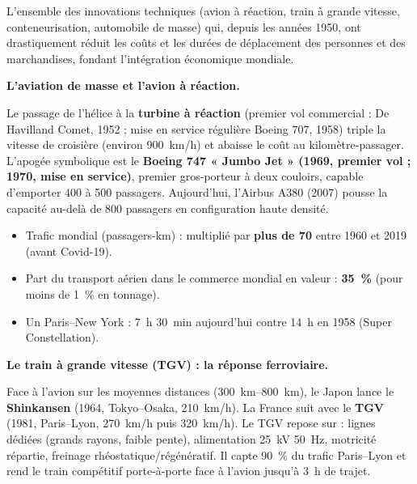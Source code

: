 \documentclass[11pt]{article}
\begin{document}
\begin{definition}
L'ensemble des innovations techniques (avion à réaction, train à grande vitesse, conteneurisation, automobile de masse) qui, depuis les années 1950, ont drastiquement réduit les coûts et les durées de déplacement des personnes et des marchandises, fondant l'intégration économique mondiale.
\end{definition}

\textbf{L'aviation de masse et l'avion à réaction.}\par
Le passage de l'hélice à la \textbf{turbine à réaction} (premier vol commercial : De Havilland Comet, 1952 ; mise en service régulière Boeing 707, 1958) triple la vitesse de croisière (environ \SI{900}{km/h}) et abaisse le coût au kilomètre-passager. L'apogée symbolique est le \textbf{Boeing 747 « Jumbo Jet » (1969, premier vol ; 1970, mise en service)}, premier gros-porteur à deux couloirs, capable d'emporter 400 à 500 passagers. Aujourd'hui, l'Airbus A380 (2007) pousse la capacité au-delà de 800 passagers en configuration haute densité.

\begin{exemplebox}
\begin{itemize}
    \item Trafic mondial (passagers-km) : multiplié par \textbf{plus de 70} entre 1960 et 2019 (avant Covid-19).
    \item Part du transport aérien dans le commerce mondial en valeur : \textbf{35~\%} (pour moins de 1~\% en tonnage).
    \item Un Paris–New York : \SI{7}{h} \SI{30}{min} aujourd'hui contre \SI{14}{h} en 1958 (Super Constellation).
\end{itemize}
\end{exemplebox}

\textbf{Le train à grande vitesse (TGV) : la réponse ferroviaire.}\par
Face à l'avion sur les moyennes distances (\SIrange{300}{800}{km}), le Japon lance le \textbf{Shinkansen} (1964, Tokyo–Osaka, \SI{210}{km/h}). La France suit avec le \textbf{TGV} (1981, Paris–Lyon, \SI{270}{km/h} puis \SI{320}{km/h}). Le TGV repose sur : lignes dédiées (grands rayons, faible pente), alimentation \SI{25}{kV} \SI{50}{Hz}, motricité répartie, freinage rhéostatique/régénératif. Il capte 90~\% du trafic Paris–Lyon et rend le train compétitif porte-à-porte face à l'avion jusqu'à \SI{3}{h} de trajet.
\end{document}
